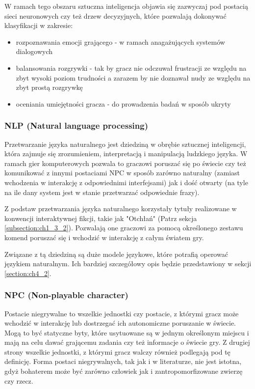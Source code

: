 W ramach tego obszaru sztuczna inteligencja objawia się zazwyczaj pod postacią sieci neuronowych czy
też drzew decyzyjnych, które pozwalają dokonywać klasyfikacji w zakresie\cite{reusable_game_ai}:

\begin{itemize}
    \item rozpoznawania emocji grającego - w ramach anagażujących systemów dialogowych
    \item balansowania rozgrywki - tak by gracz nie odczuwał frustracji ze względu na zbyt wysoki poziom
          trudności a zarazem by nie doznawał nudy ze względu na zbyt prostą rozgrywkę
    \item oceniania umiejętności gracza - do prowadzenia badań w sposób ukryty
\end{itemize}

\subsubsection*{NLP (Natural language processing)}

Przetwarzanie języka naturalnego jest dziedziną w obrębie sztucznej inteligencji, która zajmuje się
zrozumieniem, interpretacją i manipulacją ludzkiego języka\cite{reusable_game_ai}. W ramach gier
komputerowych pozwala to graczowi poruszać się po świecie czy też komunikować z innymi postaciami NPC
w sposób zarówno naturalny (zamiast wchodzenia w interakcję z odpowiednimi interfejsami) jak i dość
otwarty (na tyle na ile dany system jest w stanie przetwarzać odpowiednie frazy).

Z podstaw przetwarzania języka naturalnego korzystały tytuły realizowane w konwencji interaktywnej
fikcji, takie jak "Otchłań" (Patrz sekcja \ref{subsection:ch1_3_2}). Pozwalają one graczowi za pomocą
określonego zestawu komend poruszać się i wchodzić w interakcję z całym światem gry.

Związane z tą dziedziną są duże modele językowe, które potrafią operować językiem naturalnym.
Ich bardziej szczegółowy opis będzie przedstawiony w sekcji \ref{section:ch4_2}.

\subsubsection*{NPC (Non-playable character)}

Postacie niegrywalne to wszelkie jednostki czy postacie, z którymi gracz może wchodzić w
interakcję lub dostrzegać ich autonomiczne poruszanie w świecie. Mogą to być statyczne byty,
które usytuowane są w jednym określonym miejscu i mają na celu dawać grającemu zadania czy też
informacje o świecie gry. Z drugiej strony wszelkie jednostki, z którymi gracz walczy również
podlegają pod tę definicję. Forma postaci niegrywalnych, tak jak i w literaturze, nie jest
istotna, gdyż bohaterem może być zarówno człowiek jak i zantropomorfizowane zwierzę czy rzecz.

